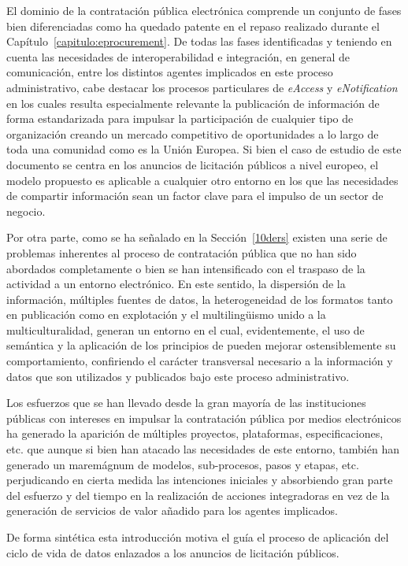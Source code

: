 El dominio de la contratación pública electrónica comprende un conjunto de fases bien diferenciadas 
como ha quedado patente en el repaso realizado durante el Capítulo~\ref{capitulo:eprocurement}. De todas las 
fases identificadas y teniendo en cuenta las necesidades de interoperabilidad e integración, en general 
de comunicación, entre los distintos agentes implicados en este proceso administrativo, cabe destacar 
los procesos particulares de \textit{eAccess} y \textit{eNotification} en los cuales resulta 
especialmente relevante la publicación de información de forma estandarizada para impulsar 
la participación de cualquier tipo de organización creando un mercado competitivo de oportunidades 
a lo largo de toda una comunidad como es la Unión Europea. Si bien el caso de estudio de este documento 
se centra en los anuncios de licitación públicos a nivel europeo, el modelo propuesto es aplicable a 
cualquier otro entorno en los que las necesidades de compartir información sean un factor clave 
para el impulso de un sector de negocio.

Por otra parte, como se ha señalado en la Sección~\ref{10ders} existen una serie de problemas 
inherentes al proceso de contratación pública que no han sido abordados completamente o bien 
se han intensificado con el traspaso de la actividad a un entorno electrónico. En este sentido, 
la dispersión de la información, múltiples fuentes de datos, la heterogeneidad de los formatos tanto 
en publicación como en explotación y el multiling\"{u}ismo unido a la multiculturalidad, generan un entorno 
en el cual, evidentemente, el uso de semántica y la aplicación de los principios de \linkeddata pueden 
mejorar ostensiblemente su comportamiento, confiriendo el carácter transversal necesario a la información 
y datos que son utilizados y publicados bajo este proceso administrativo.

Los esfuerzos que se han llevado desde la gran mayoría de las instituciones públicas con intereses 
en impulsar la contratación pública por medios electrónicos ha generado la aparición de múltiples proyectos, 
plataformas, especificaciones, etc. que aunque si bien han atacado las necesidades de este entorno, también 
han generado un maremágnum de modelos, sub-procesos, pasos y etapas, etc. perjudicando en cierta medida 
las intenciones iniciales y absorbiendo gran parte del esfuerzo y del tiempo en la realización de 
acciones integradoras en vez de la generación de servicios de valor añadido para los agentes 
implicados.

De forma sintética esta introducción motiva el guía el proceso de aplicación del ciclo de vida 
de datos enlazados a los anuncios de licitación públicos.

